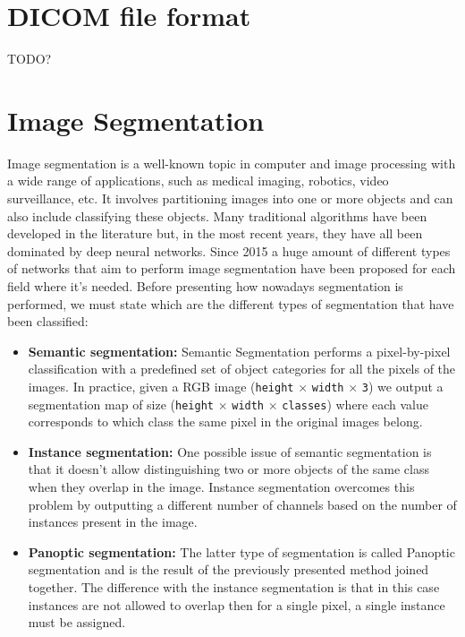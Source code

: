 \section{DICOM file format}
TODO?

\section{Image Segmentation}
Image segmentation is a well-known topic in computer and image processing with a
wide range of applications, such as medical imaging, robotics, video
surveillance, etc.
It involves partitioning images into one or more objects and can also include
classifying these objects. Many traditional algorithms have been developed in
the literature but, in the most recent years, they have all been dominated by
deep neural networks. Since 2015 a huge amount of different types of networks
that aim to perform image segmentation have been proposed for each field where
it's needed.
Before presenting how nowadays segmentation is performed, we must state which
are the different types of segmentation that have been classified:

\begin{itemize}
  \item{\textbf{Semantic segmentation:} Semantic Segmentation performs a
    pixel-by-pixel classification with a predefined set of object categories for
    all the pixels of the images. In practice, given a RGB image
    (\texttt{height} $\times$ \texttt{width} $\times$ \texttt{3}) we output a
    segmentation map of size (\texttt{height} $\times$ \texttt{width} $\times$
    \texttt{classes}) where each value corresponds to which class the same pixel
    in the original images belong.}

  \item{\textbf{Instance segmentation:} One possible issue of semantic
    segmentation is that it doesn't allow distinguishing two or more objects of
    the same class when they overlap in the image. Instance segmentation
    overcomes this problem by outputting a different number of channels based on
    the number of instances present in the image.}

  \item{\textbf{Panoptic segmentation:} The latter type of segmentation is
    called Panoptic segmentation and is the result of the previously presented
    method joined together. The difference with the instance segmentation is
    that in this case instances are not allowed to overlap then for a single
    pixel, a single instance must be assigned.}
\end{itemize}


